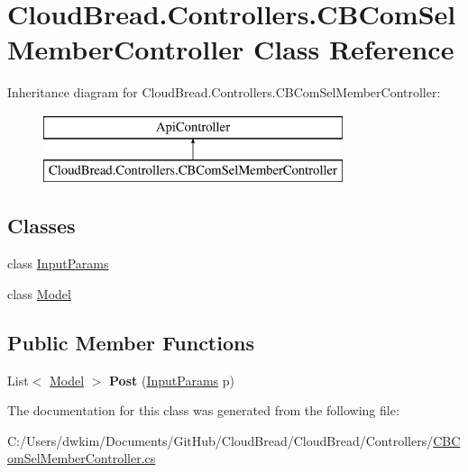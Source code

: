 \hypertarget{a00029}{}\section{Cloud\+Bread.\+Controllers.\+C\+B\+Com\+Sel\+Member\+Controller Class Reference}
\label{a00029}
Inheritance diagram for Cloud\+Bread.\+Controllers.\+C\+B\+Com\+Sel\+Member\+Controller\+:\begin{figure}[H]
\begin{center}
\leavevmode
\includegraphics[height=2.000000cm]{a00029}
\end{center}
\end{figure}
\subsection*{Classes}
\begin{DoxyCompactItemize}
\item 
class \hyperlink{a00095}{Input\+Params}
\item 
class \hyperlink{a00156}{Model}
\end{DoxyCompactItemize}
\subsection*{Public Member Functions}
\begin{DoxyCompactItemize}
\item 
List$<$ \hyperlink{a00156}{Model} $>$ {\bfseries Post} (\hyperlink{a00095}{Input\+Params} p)\hypertarget{a00029_a92ee184514d76c44b1a3cdffd4b0cb3e}{}\label{a00029_a92ee184514d76c44b1a3cdffd4b0cb3e}

\end{DoxyCompactItemize}


The documentation for this class was generated from the following file\+:\begin{DoxyCompactItemize}
\item 
C\+:/\+Users/dwkim/\+Documents/\+Git\+Hub/\+Cloud\+Bread/\+Cloud\+Bread/\+Controllers/\hyperlink{a00202}{C\+B\+Com\+Sel\+Member\+Controller.\+cs}\end{DoxyCompactItemize}
